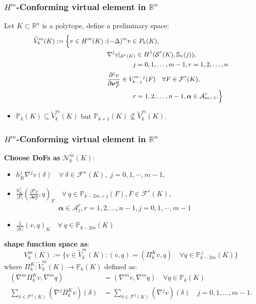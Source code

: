 \documentclass[notheorems,serif]{beamer}
\begin{document}
\begin{CJK}{UTF8}{gkai}
\begin{frame}
    \frametitle{$H^m$-Conforming virtual element in $\mathbb{R}^n$}
    Let $K \subset \mathbb{R}^n$ is a polytope, define a preliminary space:
    $$
    \small{
    \begin{aligned}
      \widetilde{V}_k^m(K) := \Big\{v \in  H^m(K) :&  (-\Delta)^m v \in P_k(K),\\
          & \nabla^j v|_{\mathcal{S}^r(K)} \in H^1(\mathcal{S}^r(K),\mathbb{S}_n(j)), \\
          & \qquad\qquad j = 0, 1, \dots, m-1, r = 1, 2, \dots, n\\
          & \frac{\partial^j v}{\partial
          \boldsymbol{\nu}_F^{\boldsymbol{\alpha}}} \in V_{k-j}^{m-j}(F) \quad 
          \forall F \in \mathcal{F}^r(K), \\
          &\qquad\qquad r = 1, 2, \dots, n-1, \boldsymbol{\alpha} \in \mathcal{A}_{m-1}^r.
          \Big\}
    \end{aligned}
    }
    $$
    \begin{itemize}
        \item $\mathbb{P}_k(K) \subseteq \widetilde{V}_k^m(K)$ but 
            $\mathbb{P}_{k+1}(K) \not\subseteq \widetilde{V}_k^m(K)$.
    \end{itemize}
\end{frame}
\begin{frame}
    \frametitle{$H^m$-Conforming virtual element in $\mathbb{R}^n$}
    \textbf{Choose DoFs as} $\mathcal{N}_k^m(K)$:
  \begin{itemize}
    \item $h_K^j\nabla^{j}v(\delta) \quad\forall~\delta\in\mathcal F^{n}(K),\;
         j=0,1,\cdots,m-1,$
    \item $\frac{h_K^{j}}{|F|}(
        \frac{\partial^{\boldsymbol{\alpha}}v}{\partial
    \boldsymbol{\nu}_F^{\boldsymbol{\alpha}}}, q)_F
        \quad\forall~q\in\mathbb P_{k-2m+j}(F), F\in\mathcal
        F^{r}(K),$\\
        $\quad\quad\quad\quad\quad\quad
        \boldsymbol{\alpha}\in \mathcal{A}_j^r, 
        r = 1, 2, \dots, n-1, j=0,1,\cdots,m-1$
    \item $\frac{1}{|K|}(v, q)_K \quad\forall~q\in\mathbb P_{k-2m}(K)$ 
  \end{itemize}
  \textbf{shape function space as}:
    $$
    V_k^m(K) := \{v \in \widetilde{V}_k^m(K): (v, q) = (\Pi_k^Kv, q) \quad 
        \forall q \in \mathbb{P}_{k-2m}^{\perp}(K)\}
    $$
where $\Pi_k^K : \widetilde{V}_k^m(K) \to \mathbb{P}_k(K)$ defined as:
$$
\begin{aligned}
    (\nabla^m \Pi_k^K v, \nabla^m q) &  = (\nabla^m v, \nabla^m q) \quad
    \forall q \in \mathbb{P}_k(K)\\
    \sum_{\delta\in\mathcal{F}^2(K)}(\nabla^j\Pi_k^K v)(\delta) & = 
    \sum_{\delta\in\mathcal{F}^2(K)}(\nabla^j v)(\delta) \quad j = 0, 1,
    \dots, m-1.
\end{aligned} 
$$
\end{frame}


\end{CJK}
\end{document}

